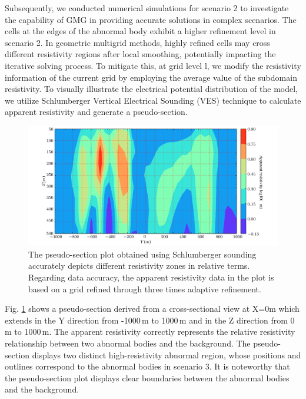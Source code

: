 \documentclass[extra, referee]{gji}
\begin{document}
Subsequently, we conducted numerical simulations for scenario 2 to investigate
the capability of GMG in providing accurate solutions in complex scenarios. The
cells at the edges of the abnormal body exhibit a higher refinement level in
scenario 2. In geometric multigrid methods, highly refined cells may cross
different resistivity regions after local smoothing, potentially impacting the
iterative solving process. To mitigate this, at grid level l, we modify the
resistivity information of the current grid by employing the average value of
the subdomain resistivity. To visually illustrate the electrical potential
distribution of the model, we utilize Schlumberger Vertical Electrical Sounding
(VES) \citep{Constable1984,Gance2014} technique to calculate apparent
resistivity and generate a pseudo-section.
\begin{figure}
  \centering
  \includegraphics[width=1\textwidth]{fig/pseudo-section.pdf}
  \caption{The pseudo-section plot obtained using Schlumberger sounding accurately depicts different resistivity zones in relative terms. Regarding data accuracy, the apparent resistivity data in the plot is based on a grid refined through three times adaptive refinement.}
  \label{fig:pseudo-section}
\end{figure}
Fig. \ref{fig:pseudo-section} shows a pseudo-section derived from a
cross-sectional view at X=0m which extends in the Y direction from -1000\,m to
1000\,m and in the Z direction from 0\,m to 1000\,m. The apparent resistivity
correctly represents the relative resistivity relationship between two abnormal
bodies and the background. The pseudo-section displays two distinct
high-resistivity abnormal region, whose positions and outlines correspond to the
abnormal bodies in scenario 3. It is noteworthy that the pseudo-section plot
displays clear boundaries between the abnormal bodies and the background.
\end{document}
